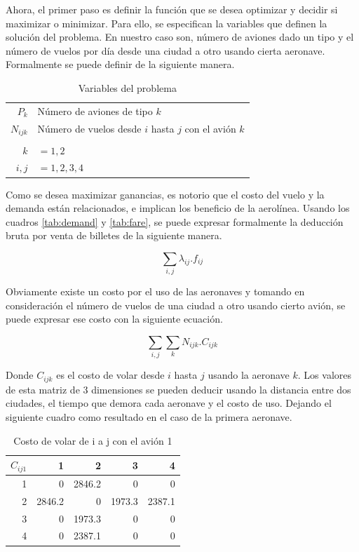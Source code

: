 \documentclass[12pt]{article}
\begin{document}
Ahora, el primer paso es definir la función que se desea optimizar y decidir si maximizar o minimizar. Para ello, se especifican la variables que definen la solución del problema. En nuestro caso son, número de aviones dado un tipo y el número de vuelos por día desde una ciudad a otro usando cierta aeronave. Formalmente se puede definir de la siguiente manera.

\begin{table}[h!]
    \centering
    \begin{tabular}{r l}
        $P_{k}$   & Número de aviones de tipo $k$\\
        $N_{ijk}$ & Número de vuelos desde $i$ hasta $j$ con el avión $k$\\
         & \\
        $k$ & $= 1,2$\\
        $i,j$ & $= 1,2,3,4$
    \end{tabular}
    \caption{Variables del problema}
    \label{tab:variables}
\end{table}

Como se desea maximizar ganancias, es notorio que el costo del vuelo y la demanda están relacionados, e implican los beneficio de la aerolínea. Usando los cuadros \ref{tab:demand} y \ref{tab:fare}, se puede expresar formalmente la deducción bruta por venta de billetes de la siguiente manera.

\begin{equation}
    \sum_{i,j} \lambda_{ij}.f_{ij}
\end{equation}

Obviamente existe un costo por el uso de las aeronaves y tomando en consideración el número de vuelos de una ciudad a otro usando cierto avión, se puede expresar ese costo con la siguiente ecuación.

\begin{equation}
    \sum_{i,j}\sum_{k} N_{ijk}.C_{ijk}
\end{equation}

Donde $C_{ijk}$ es el costo de volar desde $i$ hasta $j$ usando la aeronave $k$. Los valores de esta matriz de 3 dimensiones se pueden deducir usando la distancia entre dos ciudades, el tiempo que demora cada aeronave y el costo de uso. Dejando el siguiente cuadro como resultado en el caso de la primera aeronave.

\begin{table}[h!]
    \centering
    \begin{tabular}{r|r|r|r|r}
        $C_{ij1}$%
               &   1  &   2  &   3  &   4\\
            \hline
            \hline
              1 &      0 &  2846.2 &       0 &       0\\
              2 & 2846.2 &       0 &  1973.3 &  2387.1\\
              3 &      0 &  1973.3 &       0 &       0\\
              4 &      0 &  2387.1 &       0 &       0\\
    \end{tabular}
    \caption{Costo de volar de i a j con el avión 1}
    \label{tab:cij1}
\end{table}
\end{document}

